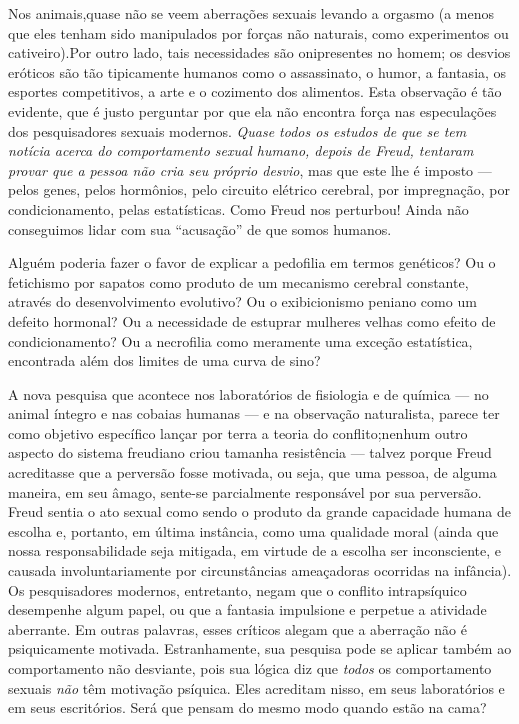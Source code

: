  Nos animais,\idxaberranim[|(] quase não se veem aberrações sexuais levando a orgasmo (a
menos que eles tenham sido manipulados por forças não naturais, como
experimentos ou cativeiro).\idxanim[|(] Por outro lado, tais necessidades são
onipresentes no homem; os desvios eróticos são tão tipicamente humanos
como o assassinato, o humor, a fantasia, os esportes competitivos, a
arte e o cozimento dos alimentos. Esta observação é tão evidente, que é
justo perguntar por que ela não encontra força nas especulações dos
pesquisadores sexuais modernos. \textit{Quase todos os estudos de que
se tem notícia acerca do comportamento sexual humano, depois de Freud,
tentaram provar que a pessoa não cria seu próprio desvio}, mas que este
lhe é imposto\idxaberrauto{} --- pelos genes, pelos hormônios, pelo circuito elétrico
cerebral, por impregnação, por condicionamento, pelas estatísticas.
Como Freud nos perturbou! Ainda não conseguimos lidar com sua
``acusação'' de que somos humanos.

 Alguém poderia fazer o favor de explicar a pedofilia\idxpedof{} em termos
genéticos? Ou o fetichismo\idxfetic{} por sapatos como produto de um mecanismo
cerebral constante, através do desenvolvimento evolutivo? Ou o
exibicionismo\idxexibi{} peniano como um defeito hormonal? Ou a necessidade de
estuprar\idxestup{} mulheres velhas como efeito de condicionamento? Ou a
necrofilia\idxnecro{} como meramente uma exceção estatística, encontrada além dos
limites de uma curva de sino?

 A nova pesquisa que acontece nos laboratórios de fisiologia e de
química --- no animal íntegro e nas cobaias humanas --- e na
observação naturalista, parece ter como objetivo específico lançar por
terra a teoria do conflito;\idxsexopteor[|(] nenhum outro aspecto do sistema freudiano
criou tamanha resistência --- talvez porque Freud acreditasse que a
perversão fosse motivada, ou seja, que uma pessoa, de alguma maneira,
em seu âmago, sente-se parcialmente responsável por sua perversão.
Freud sentia o ato sexual como sendo o produto da grande capacidade
humana de escolha e, portanto, em última instância, como uma qualidade
moral (ainda que nossa responsabilidade seja mitigada, em virtude de a
escolha ser inconsciente, e causada involuntariamente por
circunstâncias ameaçadoras ocorridas na infância). Os pesquisadores
modernos, entretanto, negam que o conflito intrapsíquico desempenhe
algum papel, ou que a fantasia impulsione e perpetue a atividade
aberrante. Em outras palavras, esses críticos alegam que a aberração
não é psiquicamente motivada. Estranhamente, sua pesquisa pode se
aplicar também ao comportamento não desviante, pois sua lógica diz que
\textit{todos} os comportamento sexuais \textit{não} têm motivação
psíquica. Eles acreditam nisso, em seus laboratórios e em seus
escritórios. Será que pensam do mesmo modo quando estão na cama?

